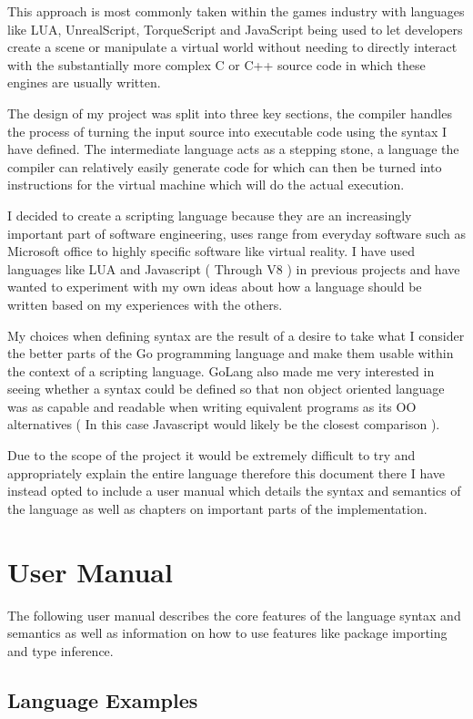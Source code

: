 \documentclass[]{final_report}
\begin{document}
This approach is most commonly taken within the games industry with languages like LUA, UnrealScript, TorqueScript and JavaScript being used to let developers create a scene or manipulate a virtual world without needing to directly interact with the substantially more complex C or C++ source code in which these engines are usually written.

The design of my project was split into three key sections, the compiler handles the process of turning the input source into executable code using the syntax I have defined. The intermediate language acts as a stepping stone, a language the compiler can relatively easily generate code for which can then be turned into instructions for the virtual machine which will do the actual execution.

I decided to create a scripting language because they are an increasingly important part of software engineering, uses range from everyday software such as Microsoft office to highly specific software like virtual reality. I have used languages like LUA and Javascript ( Through V8 ) in previous projects and have wanted to experiment with my own ideas about how a language should be written based on my experiences with the others. 

My choices when defining syntax are the result of a desire to take what I consider the better parts of the Go programming language and make them usable within the context of a scripting language. GoLang also made me very interested in seeing whether a syntax could be defined so that non object oriented language was as capable and readable when writing equivalent programs as its OO alternatives ( In this case Javascript would likely be the closest comparison ).

Due to the scope of the project it would be extremely difficult to try and appropriately explain the entire language therefore this document there I have instead opted to include a user manual which details the syntax and semantics of the language as well as chapters on important parts of the implementation.

\chapter{User Manual}

The following user manual describes the core features of the language syntax and semantics as well as information on how to use features like package importing and type inference.

\section{Language Examples}
\end{document}
